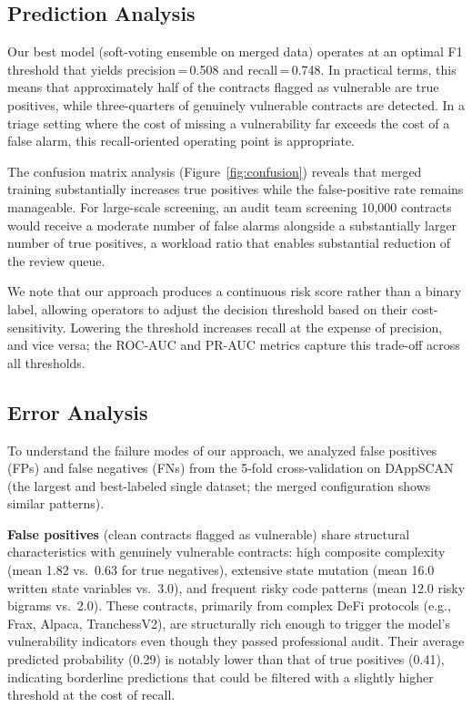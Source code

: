 \documentclass[11pt,a4paper]{article}
\begin{document}
\subsection{Prediction Analysis}

Our best model (soft-voting ensemble on merged data) operates at an optimal F1 threshold that yields precision\,=\,0.508 and recall\,=\,0.748.
In practical terms, this means that approximately half of the contracts flagged as vulnerable are true positives, while three-quarters of genuinely vulnerable contracts are detected.
In a triage setting where the cost of missing a vulnerability far exceeds the cost of a false alarm, this recall-oriented operating point is appropriate.

The confusion matrix analysis (Figure~\ref{fig:confusion}) reveals that merged training substantially increases true positives while the false-positive rate remains manageable.
For large-scale screening, an audit team screening 10,000 contracts would receive a moderate number of false alarms alongside a substantially larger number of true positives, a workload ratio that enables substantial reduction of the review queue.

We note that our approach produces a continuous risk score rather than a binary label, allowing operators to adjust the decision threshold based on their cost-sensitivity.
Lowering the threshold increases recall at the expense of precision, and vice versa; the ROC-AUC and PR-AUC metrics capture this trade-off across all thresholds.

\subsection{Error Analysis}

To understand the failure modes of our approach, we analyzed false positives (FPs) and false negatives (FNs) from the 5-fold cross-validation on DAppSCAN (the largest and best-labeled single dataset; the merged configuration shows similar patterns).

\textbf{False positives} (clean contracts flagged as vulnerable) share structural characteristics with genuinely vulnerable contracts: high composite complexity (mean 1.82 vs.\ 0.63 for true negatives), extensive state mutation (mean 16.0 written state variables vs.\ 3.0), and frequent risky code patterns (mean 12.0 risky bigrams vs.\ 2.0).
These contracts, primarily from complex DeFi protocols (e.g., Frax, Alpaca, TranchessV2), are structurally rich enough to trigger the model's vulnerability indicators even though they passed professional audit.
Their average predicted probability (0.29) is notably lower than that of true positives (0.41), indicating borderline predictions that could be filtered with a slightly higher threshold at the cost of recall.
\end{document}
